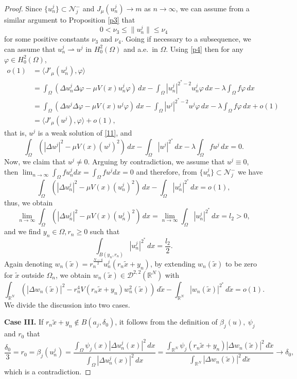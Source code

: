 \documentclass[reqno]{amsart}
\begin{document}
\begin{proof}
Since \(\{u_n^j\} \subset \mathcal{N}^-_j\) and \(J_{\mu}(u_n^j)\to m\) as 
\(n\to \infty\), we can assume from a similar argument to Proposition \ref{p3} that
\[
 0<\nu_3\leq \|u_n^j\|\leq \nu_4
\]
for some positive constants $\nu_3$ and $\nu_4$. Going if necessary to a subsequence, 
we can assume that \(u_n^j\rightharpoonup u^j\) in \(H^2_0(\Omega)\) and a.e.\
in \(\Omega\). Using \eqref{p4} then for any \(\varphi \in H^2_0(\Omega)\),
\begin{align*}
 o(1)&=\langle J'_{\mu}(u_n^j), \varphi \rangle\\
 &=\int _\Omega \left( \Delta u_n^j \Delta \varphi -\mu V(x)u_n^j \varphi \right)\,dx - \int _\Omega |u_n^j|^{2^*-2}u_n^j \varphi\, dx- \lambda \int _\Omega f\varphi \,dx\\
 &=\int _\Omega \left( \Delta u^j \Delta \varphi -\mu V(x)u^j \varphi \right)\,dx - \int _\Omega |u^j|^{2^*-2}u^j \varphi \,dx- \lambda \int _\Omega f\varphi \,dx +o(1)\\
 &=\langle J'_{\mu}(u^j), \varphi \rangle+o(1),
 \end{align*}
that is, \(u^j\) is a weak solution of \eqref{11}, and
\begin{equation}\label{z1}
 \int_{\Omega}\left( |\Delta u^j|^2-\mu V(x)(u^j)^2\right)\,dx - \int_{\Omega}|u^j|^{2^*}\,dx -\lambda \int_{\Omega}fu^j \,dx=0.
\end{equation}
Now, we claim that \(u^j\neq 0\). Arguing by contradiction, we assume that 
\(u^j\equiv 0\), then \(\lim_{n\to \infty}\int _\Omega fu_n^jdx
= \int _\Omega fu^jdx=0\) and therefore, from 
\(\{u_n^j\} \subset \mathcal{N}^-_j\) we have
\[
 \int_{\Omega}\left( |\Delta u_n^j|^2-\mu V(x)(u_n^j)^2\right)\,dx -\int_{\Omega} |u_n^j|^{2^*}\,dx=o(1),
\]
thus, we obtain
 \[
 \lim_{n\to \infty}\int_{\Omega}(|\Delta u_n^j|^2-\mu V(x)(u_n^j)^2)\,dx=\lim_{n\to \infty} \int_{\Omega} |u_n^j|^{2^*}\,dx=l_2>0,
 \]
and we find \(y_n\in \Omega, r_n\geq 0\) such that
\[
 \int _{B(y_n, r_n)}|u_n^j|^{2^*}\,dx=\frac{l_2}{2}.
\]
Again denoting \(w_n(\tilde{x})=r_n^{\frac{N-4}{2}}u_n^j(r_n\tilde{x}+y_n)\), by extending \(w_n(\tilde{x})\) to be zero for \(\tilde{x}\) outside \(\Omega_n\), we obtain \(w_n(\tilde{x})\in \mathcal{D}^{2,2}(\mathbb{R}^N)\) with
 \[
 \int_{\mathbb{R}^N}\left( |\Delta w_n(\tilde{x})|^2-r_n^4 V(r_n\tilde{x}+y_n)w_n^2(\tilde{x})\right) \,d\tilde{x}-\int _{\mathbb{R}^N}|w_n(\tilde{x})|^{2^*}\,d\tilde{x}=o(1).
 \]
 We divide the discussion into two cases.
\smallskip

\noindent\textbf{Case III.} 
If \(r_n\tilde{x}+y_n \notin B(a_j, \delta_0)\), it follows from the definition of 
\(\beta_j(u), \ \psi_{j}\) and \(r_0\) that
\[
 \frac{\delta_0}{3}=r_0=\beta_j(u_n^j)=\frac{\int_{\Omega} 
 \psi_{j}(x)|\Delta u_n^j(x)|^2\,dx}{\int_{\Omega} |\Delta u_n^j(x)|^2\,dx}
 =\frac{\int_{\mathbb{R}^N} \psi_{j}(r_n\tilde{x}+y_n)|\Delta w_n(\tilde{x})|^2
 \,d\tilde{x}}{\int_{\mathbb{R}^N} |\Delta w_n(\tilde{x})|^2\,d\tilde{x}} 
 \to \delta_0,
\]
which is a contradiction.
\smallskip


\end{proof}
\end{document}
